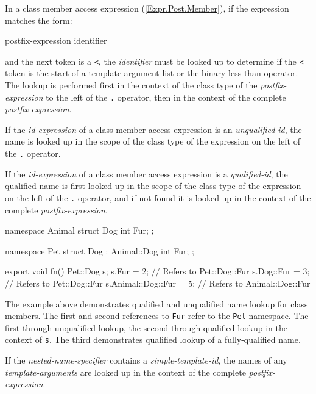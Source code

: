 
\p In a class member access expression (\ref{Expr.Post.Member}), if the
expression matches the form:
\begin{innergrammar}
  postfix-expression  identifier
\end{innergrammar}
and the next token is a \texttt{<}, the \textit{identifier} must be looked up to
determine if the \texttt{<} token is the start of a template argument list or
the binary less-than operator. The lookup is performed first in the context of
the class type of the \textit{postfix-expression} to the left of the \texttt{.}
operator, then in the context of the complete \textit{postfix-expression}.

\p If the \textit{id-expression} of a class member access expression is an
\textit{unqualified-id}, the name is looked up in the scope of the class type of
the expression on the left of the \texttt{.} operator.

\p If the \textit{id-expression} of a class member access expression is a
\textit{qualified-id}, the qualified name is first looked up in the scope of the
class type of the expression on the left of the \texttt{.} operator, and if not
found it is looked up in the context of the complete
\textit{postfix-expression}.

\begin{HLSL}
namespace Animal {
    struct Dog {
        int Fur;
    };
}

namespace Pet {
    struct Dog : Animal::Dog {
        int Fur;
    };
}

export void fn() {
    Pet::Dog s;
    s.Fur = 2;               // Refers to Pet::Dog::Fur
    s.Dog::Fur = 3;          // Refers to Pet::Dog::Fur
    s.Animal::Dog::Fur = 5;  // Refers to Animal::Dog::Fur
}
\end{HLSL}

\begin{note}
  The example above demonstrates qualified and unqualified name lookup for class
  members. The first and second references to \texttt{Fur} refer to the
  \texttt{Pet} namespace. The first through unqualified lookup, the second
  through qualified lookup in the context of \texttt{s}. The third demonstrates
  qualified lookup of a fully-qualified name.
\end{note}

\p If the \textit{nested-name-specifier} contains a \textit{simple-template-id},
the names of any \textit{template-arguments} are looked up in the context of the
complete \textit{postfix-expression}.

